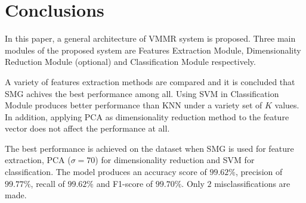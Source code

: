 \chapter{Conclusions}
\label{chap:conclusions}

In this paper, a general architecture of VMMR system is proposed. Three main modules of the proposed system are Features Extraction Module, Dimensionality Reduction Module (optional) and Classification Module respectively.

A variety of features extraction methods are compared and it is concluded that SMG achives the best performance among all.
Using SVM in Classification Module produces better performance than KNN under a variety set of $K$ values.
In addition, applying PCA as dimensionality reduction method to the feature vector does not affect the performance at all.

The best performance is achieved on the dataset when SMG is used for feature extraction, PCA ($\sigma = 70$) for dimensionality reduction and SVM for classification.
The model produces an accuracy score of $99.62\%$, precision of $99.77\%$, recall of $99.62\%$ and F1-score of $99.70\%$.
Only $2$ misclassifications are made.
